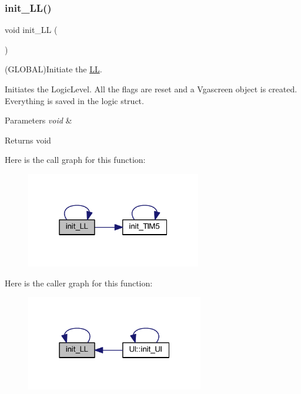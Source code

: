 \subsubsection{\texorpdfstring{init\+\_\+\+L\+L()}{init\_LL()}}
{\footnotesize\ttfamily void init\+\_\+\+LL (\begin{DoxyParamCaption}\item[{void}]{ }\end{DoxyParamCaption})}



(G\+L\+O\+B\+AL)Initiate the \mbox{\hyperlink{namespace_l_l}{LL}}. 

Initiates the Logic\+Level. All the flags are reset and a Vgascreen object is created. Everything is saved in the logic struct.


\begin{DoxyParams}{Parameters}
{\em void} & \\
\hline
\end{DoxyParams}
\begin{DoxyReturn}{Returns}
void 
\end{DoxyReturn}
Here is the call graph for this function\+:\nopagebreak
\begin{figure}[H]
\begin{center}
\leavevmode
\includegraphics[width=217pt]{namespace_l_l_a201bbec5c7219ca80c90d31b0a31b482_cgraph}
\end{center}
\end{figure}
Here is the caller graph for this function\+:\nopagebreak
\begin{figure}[H]
\begin{center}
\leavevmode
\includegraphics[width=220pt]{namespace_l_l_a201bbec5c7219ca80c90d31b0a31b482_icgraph}
\end{center}
\end{figure}
\mbox{\label{namespace_l_l_a559eb54e37dc62032e9774315c2b4638}} 
